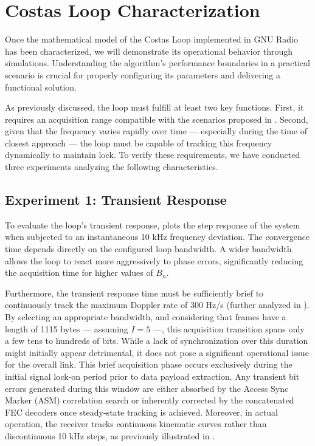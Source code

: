 \section{Costas Loop Characterization}

Once the mathematical model of the Costas Loop implemented in GNU Radio has been characterized, we will demonstrate its operational behavior through simulations. Understanding the algorithm's performance boundaries in a practical scenario is crucial for properly configuring its parameters and delivering a functional solution. 

As previously discussed, the loop must fulfill at least two key functions. First, it requires an acquisition range compatible with the scenarios proposed in . Second, given that the frequency varies rapidly over time --- especially during the time of closest approach --- the loop must be capable of tracking this frequency dynamically to maintain lock. To verify these requirements, we have conducted three experiments analyzing the following characteristics.

\subsection{Experiment 1: Transient Response}

To evaluate the loop's transient response,  plots the step response of the system when subjected to an instantaneous 10 kHz frequency deviation. The convergence time depends directly on the configured loop bandwidth. A wider bandwidth allows the loop to react more aggressively to phase errors, significantly reducing the acquisition time for higher values of $B_n$.

Furthermore, the transient response time must be sufficiently brief to continuously track the maximum Doppler rate of 300 Hz/s (further analyzed in ). By selecting an appropriate bandwidth, and considering that frames have a length of 1115 bytes --- assuming $I=5$ ---, this acquisition transition spans only a few tens to hundreds of bits. While a lack of synchronization over this duration might initially appear detrimental, it does not pose a significant operational issue for the overall link. This brief acquisition phase occurs exclusively during the initial signal lock-on period prior to data payload extraction. Any transient bit errors generated during this window are either absorbed by the Access Sync Marker (ASM) correlation search or inherently corrected by the concatenated FEC decoders once steady-state tracking is achieved. Moreover, in actual operation, the receiver tracks continuous kinematic curves rather than discontinuous 10 kHz steps, as previously illustrated in .

